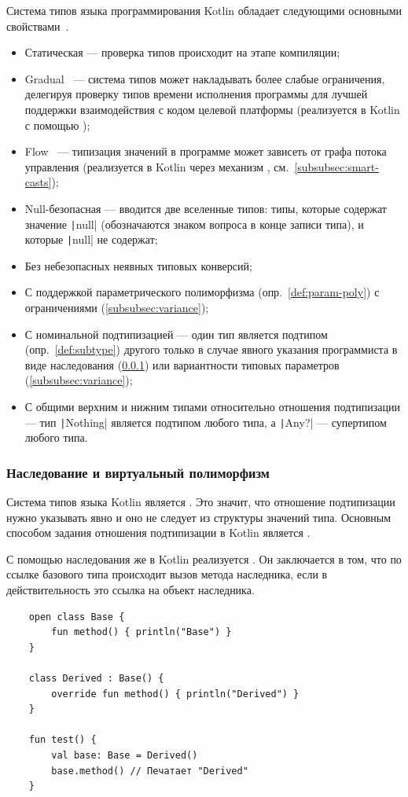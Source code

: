 Система типов языка программирования Kotlin обладает следующими основными свойствами~\cite{akhin2021kotlin}.
\begin{itemize}
    \item Статическая --- проверка типов происходит на этапе компиляции;
    \item Gradual~\cite{siek2007gradual} --- система типов может накладывать более слабые ограничения, делегируя проверку типов времени исполнения программы для лучшей поддержки взаимодействия с кодом целевой платформы (реализуется в Kotlin с помощью );
    \item Flow~\cite{pearce2013calculus} --- типизация значений в программе может зависеть от графа потока управления (реализуется в Kotlin через механизм , см.~\ref{subsubsec:smart-casts});
    \item Null-безопасная --- вводится две вселенные типов: типы, которые содержат значение \texttt|null| (обозначаются знаком вопроса в конце записи типа), и которые \texttt|null| не содержат;
    \item Без небезопасных неявных типовых конверсий;
    \item С поддержкой параметрического полиморфизма (опр.~\ref{def:param-poly}) с ограничениями (\ref{subsubsec:variance});
    \item С номинальной подтипизацией --- один тип является подтипом (опр.~\ref{def:subtype}) другого только в случае явного указания программиста в виде наследования (\ref{subsubsec:interitance-virtual}) или вариантности типовых параметров (\ref{subsubsec:variance});
    \item С общими верхним и нижним типами относительно отношения подтипизации --- тип \texttt|Nothing| является подтипом любого типа, а \texttt|Any?| --- супертипом любого типа.
\end{itemize}

\subsubsection{Наследование и виртуальный полиморфизм} \label{subsubsec:interitance-virtual}

Система типов языка Kotlin является .
Это значит, что отношение подтипизации нужно указывать явно и оно не следует из структуры значений типа.
Основным способом задания отношения подтипизации в Kotlin является .

С помощью наследования же в Kotlin реализуется .
Он заключается в том, что по ссылке базового типа происходит вызов метода наследника, если в действительность это ссылка на объект наследника.
\begin{verbatim}
    open class Base {
        fun method() { println("Base") }
    }

    class Derived : Base() {
        override fun method() { println("Derived") }
    }

    fun test() {
        val base: Base = Derived()
        base.method() // Печатает "Derived"
    }
\end{verbatim}

